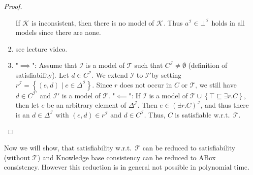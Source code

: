 \begin{proof}
\begin{enumerate}
			If $\mathcal{K}$ is inconsistent, then there is no model of $\mathcal{K}$.
			Thus $a^{\mathcal{I}} \in \bot^\mathcal{I}$ holds in all models since there are none.
		\item see lecture video.
		\item "$ \implies$": \newline
			Assume that $\mathcal{I}$ is a model of $\mathcal{T}$ such that $C^\mathcal{I} \neq \emptyset$
			(definition of satisfiability).
			Let $d \in C^{\mathcal{I}}$.
			We extend $\mathcal{I}$ to $\mathcal{I}'$by setting $r^{\mathcal{I}} = \left\{ (e,d) \mid  e \in \Delta^{\mathcal{I}} \right\}$.
			Since $r$ does not occur in $C$ or $\mathcal{T}$, we still have $d \in C^\mathcal{I'}$ and $\mathcal{I'}$ is a model of $\mathcal{T}$. \newline
			"$\impliedby$": \newline
			If $\mathcal{I}$ is a model of $\mathcal{T} \cup \left\{ \top \sqsubseteq \exists r.C \right\}$,
			then let $e$ be an arbitrary element of $\Delta^{\mathcal{I}}$.
			Then $e \in \left( \exists r.C \right)^{\mathcal{I}}$, and thus there is an $d \in \Delta^{\mathcal{I}}$ 
			with $\left( e,d \right) \in r^{\mathcal{I}}$ and $d \in C^\mathcal{I}$.
			Thus, $C$ is satisfiable w.r.t.\ $\mathcal{T}$.
			\qedhere
	\end{enumerate}
\end{proof}

Now we will show, that satisfiability w.r.t.\ $\mathcal{T}$ can be reduced to satisfiability (without $\mathcal{T}$) and
Knowledge base consistency can be reduced to ABox consistency.
However this reduction is in general not possible in polynomial time.

